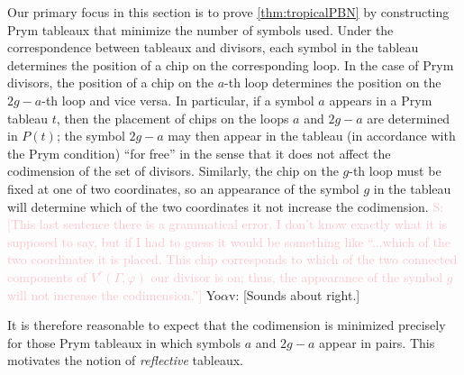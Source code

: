 \documentclass[11pt,reqno]{amsart}
\newcommand*{\wti}[1]{\widetilde{#1}}
\newcommand{\yoav}[1]{{\color{blue} \sf  Yo$\alpha$v: [#1]}}
\newcommand{\caelan}[1]{\textcolor{orange}{\sf C: [#1]}}
\newcommand{\steven}[1]{\textcolor{pink}{\sf S: [#1]}}
\DeclareMathOperator{\Pic}{Pic}
\DeclareMathOperator{\Prym}{Prym}
\theoremstyle{definition}
\theoremstyle{problem}
\theoremstyle{plain}
\theoremstyle{remark}
\theoremstyle{theorem}
\numberwithin{equation}{section}
\numberwithin{figure}{section}
\begin{document}
Our primary focus in this section is to prove \cref{thm:tropicalPBN}
by constructing Prym tableaux that minimize the number of symbols
used.  Under the correspondence between tableaux and divisors, each
symbol in the tableau determines the position of a chip on the
corresponding loop. In the case of Prym divisors, the position of a
chip on the $a$-th loop determines the position on the $2g-a$-th loop
and vice versa.  In particular, if a symbol $a$ appears in a Prym
tableau $t$, then the placement of chips on the loops $a$ and $2g-a$
are determined in $P(t)$; the symbol $2g-a$ may then appear in the
tableau (in accordance with the Prym condition) ``for free'' in the
sense that it does not affect the codimension of the set of divisors.
Similarly, the chip on the $g$-th loop must be fixed at one of two
coordinates, so an appearance of the symbol $g$ in the tableau will
determine which of the two coordinates it
not increase the codimension.
\steven{This last sentence there is a grammatical error. I don't know exactly what it is supposed to say, but if I had to guess it would be something like ``...which of the two coordinates it is placed. This chip corresponds to which of the two connected components of $V^r(\Gamma, \varphi)$ our divisor is on; thus, the appearance of the symbol $g$ will not increase the codimension.''}\yoav{Sounds about right.}

It is therefore reasonable to expect that the codimension is minimized
precisely for those Prym tableaux in which symbols $a$ and $2g-a$
appear in pairs. This motivates the notion of \emph{reflective}
tableaux.

\end{document}
